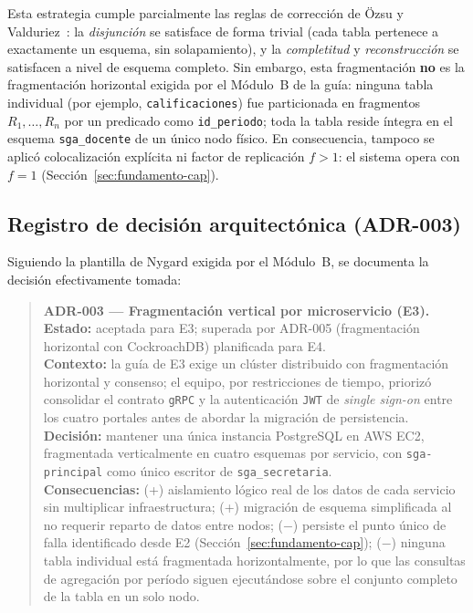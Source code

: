 \documentclass[12pt,a4paper]{article}
\begin{document}
Esta estrategia cumple parcialmente las reglas de corrección de
Özsu y Valduriez~\cite{ozsu2020principles}: la \emph{disjunción} se
satisface de forma trivial (cada tabla pertenece a exactamente un esquema,
sin solapamiento), y la \emph{completitud} y \emph{reconstrucción} se
satisfacen a nivel de esquema completo. Sin embargo, esta fragmentación
\textbf{no} es la fragmentación horizontal exigida por el Módulo~B de la
guía: ninguna tabla individual (por ejemplo, \texttt{calificaciones}) fue
particionada en fragmentos $R_1,\dots,R_n$ por un predicado como
\texttt{id\_periodo}; toda la tabla reside íntegra en el esquema
\texttt{sga\_docente} de un único nodo físico. En consecuencia, tampoco se
aplicó colocalización explícita ni factor de replicación $f>1$: el sistema
opera con $f=1$ (Sección~\ref{sec:fundamento-cap}).

\subsection{Registro de decisión arquitectónica (ADR-003)}

Siguiendo la plantilla de Nygard exigida por el Módulo~B, se documenta la
decisión efectivamente tomada:

\begin{quote}
\textbf{ADR-003 --- Fragmentación vertical por microservicio (E3).}\\
\textbf{Estado:} aceptada para E3; superada por ADR-005 (fragmentación
horizontal con CockroachDB) planificada para E4.\\
\textbf{Contexto:} la guía de E3 exige un clúster distribuido con
fragmentación horizontal y consenso; el equipo, por restricciones de
tiempo, priorizó consolidar el contrato \texttt{gRPC} y la autenticación
\texttt{JWT} de \emph{single sign-on} entre los cuatro portales antes de
abordar la migración de persistencia.\\
\textbf{Decisión:} mantener una única instancia PostgreSQL en AWS EC2,
fragmentada verticalmente en cuatro esquemas por servicio, con
\texttt{sga-principal} como único escritor de \texttt{sga\_secretaria}.\\
\textbf{Consecuencias:} (+) aislamiento lógico real de los datos de cada
servicio sin multiplicar infraestructura; (+) migración de esquema
simplificada al no requerir reparto de datos entre nodos; ($-$) persiste el
punto único de falla identificado desde E2 (Sección~\ref{sec:fundamento-cap});
($-$) ninguna tabla individual está fragmentada horizontalmente, por lo que
las consultas de agregación por período siguen ejecutándose sobre el
conjunto completo de la tabla en un solo nodo.
\end{quote}
\end{document}
